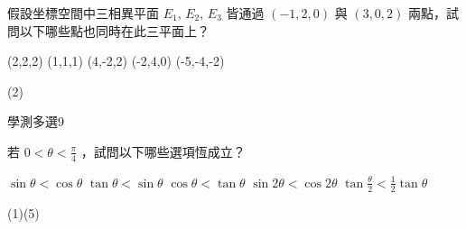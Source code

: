 \begin{QUESTIONS}
\begin{QUESTION}
        \begin{QBODY}
            假設坐標空間中三相異平面 $E_1$, $E_2$, $E_3$ 皆通過 $(-1,2,0)$ 與 $(3,0,2)$ 兩點，試問以下哪些點也同時在此三平面上？ 
			\begin{QOPS} 
				\QOP (2,2,2) 
				\QOP (1,1,1) 
				\QOP (4,-2,2) 
				\QOP (-2,4,0) 
				\QOP (-5,-4,-2)
			\end{QOPS}
        \end{QBODY}
        \begin{QFROMS}
        \end{QFROMS}
        \begin{QTAGS}\end{QTAGS}
        \begin{QANS}
            (2)
        \end{QANS}
        \begin{QSOLLIST}
        \end{QSOLLIST}
        \begin{QEMPTYSPACE}
        \end{QEMPTYSPACE}
    \end{QUESTION}
    \begin{QUESTION}
        \begin{ExamInfo}{94}{學測}{多選}{9}
        \end{ExamInfo}
        \begin{ExamAnsRateInfo}{37}{69}{32}{10}
        \end{ExamAnsRateInfo}
        \begin{QBODY}
            若 $0 < \theta < \frac{\pi}{4}$ ，試問以下哪些選項恆成立？ 
			\begin{QOPS} 
				\QOP	$\sin \theta < \cos \theta$	
				\QOP	$\tan \theta < \sin \theta$ 
				\QOP $\cos \theta < \tan \theta$ 
				\QOP $\sin{2\theta} <\cos{2\theta}$ 
				\QOP $\tan{\frac{\theta}{2}} <\frac{1}{2} \tan \theta$
			\end{QOPS}
        \end{QBODY}
        \begin{QFROMS}
        \end{QFROMS}
        \begin{QTAGS}\end{QTAGS}
        \begin{QANS}
            (1)(5)
        \end{QANS}
        \begin{QSOLLIST}
        \end{QSOLLIST}

\end{QUESTION}
\end{QUESTIONS}
